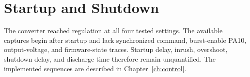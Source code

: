 \section{Startup and Shutdown}
\label{sec:res-startup}

The converter reached regulation at all four tested settings. The available
captures begin after startup and lack synchronized command, burst-enable
PA10, output-voltage, and firmware-state traces. Startup delay, inrush,
overshoot, shutdown delay, and discharge time therefore remain unquantified.
The implemented sequences are described in Chapter~\ref{ch:control}.
